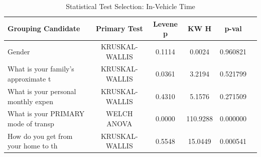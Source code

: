\begin{table}[htbp]
\centering
\caption{Statistical Test Selection: In-Vehicle Time}
\label{tab:analysis_03_in_vehicle_time}
\begin{tabular}{lccccc}
\hline
\textbf{Grouping Candidate} & \textbf{Primary Test} & \textbf{Levene p} & \textbf{KW H} & \textbf{p-val} \\
\hline
Gender & KRUSKAL-WALLIS & 0.1114 & 0.0024 & 0.960821 \\
What is your family's approximate t & KRUSKAL-WALLIS & 0.0361 & 3.2194 & 0.521799 \\
What is your personal monthly expen & KRUSKAL-WALLIS & 0.4310 & 5.1576 & 0.271509 \\
What is your PRIMARY mode of transp & WELCH ANOVA & 0.0000 & 110.9288 & 0.000000 \\
How do you get from your home to th & KRUSKAL-WALLIS & 0.5548 & 15.0449 & 0.000541 \\
\hline
\end{tabular}
\end{table}
